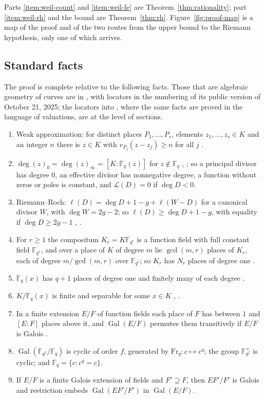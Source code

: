 \documentclass[11pt]{amsbook}
\theoremstyle{plain}
\theoremstyle{definition}
\theoremstyle{remark}
\numberwithin{equation}{section}
\numberwithin{figure}{chapter}
\numberwithin{table}{chapter}
\newcommand{\F}{\mathbb{F}}
\newcommand{\Gal}{\operatorname{Gal}}
\newcommand{\Fr}{\mathrm{Fr}}
\newcommand{\calL}{\mathcal{L}}
\begin{document}
Parts \eqref{item:weil-count} and \eqref{item:weil-fe} are
Theorem~\ref{thm:rationality}; part \eqref{item:weil-rh} and the
bound are Theorem~\ref{thm:rh}. Figure~\ref{fig:proof-map} is a map
of the proof and of the two routes from the upper bound to the
Riemann hypothesis, only one of which arrives.

\subsection{Standard facts}

The proof is complete relative to the following facts. Those that
are algebraic geometry of curves are in \cite{Vakil2025}, with
locators in the numbering of its public version of October 21,
2025; the locators into \cite{Stichtenoth2009}, where the same facts
are proved in the language of valuations, are at the level of
sections.
\begin{enumerate}[label=(S\arabic*),ref=S\arabic*,itemsep=0pt]
\item\label{S1} Weak approximation: for distinct places
$P_1,\dots,P_s$, elements $z_1,\dots,z_s\in K$ and an integer $n$
there is $z\in K$ with $v_{P_j}(z-z_j)\ge n$ for all $j$
\cite[\S1.3]{Stichtenoth2009}.
\item\label{S2} $\deg(z)_0=\deg(z)_\infty=[K:\F_q(z)]$ for
$z\notin\F_q$ \cite[Exercises~16.3.E and~18.4.E]{Vakil2025},
\cite[\S1.4]{Stichtenoth2009}; so a
principal divisor has degree $0$, an effective divisor has
nonnegative degree, a function without zeros or poles is constant,
and $\calL(D)=0$ if $\deg D<0$.
\item\label{S3} Riemann--Roch:
$\ell(D)=\deg D+1-g+\ell(W-D)$ for a canonical divisor $W$, with
$\deg W=2g-2$; so $\ell(D)\ge\deg D+1-g$, with equality if
$\deg D\ge2g-1$
\cite[Exercise~18.4.B, \S18.5.3, Exercise~18.5.A]{Vakil2025},
\cite[\S1.5]{Stichtenoth2009}.
\item\label{S4} For $r\ge1$ the compositum $K_r=K\F_{q^r}$ is a
function field with full constant field $\F_{q^r}$, and over a place
of $K$ of degree $m$ lie $\gcd(m,r)$ places of $K_r$, each of degree
$m/\gcd(m,r)$ over $\F_{q^r}$; so $K_r$ has $N_r$ places of degree
one \cite[\S3.6, \S5.1]{Stichtenoth2009}.
\item\label{S5} $\F_q(x)$ has $q+1$ places of degree one and
finitely many of each degree \cite[\S1.2]{Stichtenoth2009}.
\item\label{S6} $K/\F_q(x)$ is finite and separable for some
$x\in K$ \cite[Theorem~10.5.17]{Vakil2025},
\cite[\S3.10]{Stichtenoth2009}.
\item\label{S7} In a finite extension $E/F$ of function fields each
place of $F$ has between $1$ and $[E:F]$ places above it, and
$\Gal(E/F)$ permutes them transitively if $E/F$ is Galois
\cite[\S3.1, \S3.7]{Stichtenoth2009}.
\item\label{S8} $\Gal(\F_{q^f}/\F_q)$ is cyclic of order $f$,
generated by $\Fr_q\colon c\mapsto c^q$; the group
$\F_{q^f}^\times$ is cyclic; and $\F_q=\{c:c^q=c\}$.
\item\label{S9} If $E/F$ is a finite Galois extension of fields and
$F'\supseteq F$, then $EF'/F'$ is Galois and restriction embeds
$\Gal(EF'/F')$ in $\Gal(E/F)$.
\end{enumerate}
\end{document}
